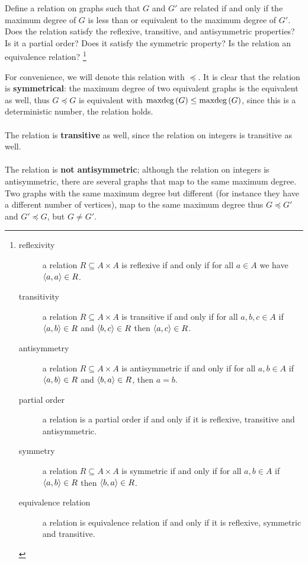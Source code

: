 \documentclass{article}
\begin{document}
\begin{exercise}
Define a relation on graphs such that $G$ and $G'$ are related if and only if the maximum degree of $G$ is less than or equivalent to the maximum degree of $G'$. Does the relation satisfy the reflexive, transitive, and antisymmetric properties? Is it a partial order? Does it satisfy the symmetric property? Is the relation an equivalence relation?
\footnote{\begin{description}
 \item[reflexivity] a relation $R\subseteq A\times A$ is reflexive if and only if for all $a\in A$ we have $\left\langle a,a \right\rangle\in R$.
 \item[transitivity] a relation $R\subseteq A\times A$ is transitive if and only if for all $a,b,c\in A$ if $\left\langle a,b \right\rangle\in R$ and $\left\langle b,c \right\rangle\in R$ then $\left\langle a,c \right\rangle\in R$.
 \item[antisymmetry] a relation $R\subseteq A\times A$ is antisymmetric if and only if for all $a,b\in A$ if $\left\langle a,b \right\rangle\in R$ and $\left\langle b,a \right\rangle\in R$, then $a=b$.
 \item[partial order] a relation is a partial order if and only if it is reflexive, transitive and antisymmetric.
 \item[symmetry] a relation $R\subseteq A\times A$ is symmetric if and only if for all $a,b\in A$ if $\left\langle a,b \right\rangle\in R$ then $\left\langle b,a \right\rangle\in R$.
 \item[equivalence relation] a relation is equivalence relation if and only if it is reflexive, symmetric and transitive.
\end{description}}
\begin{answer}
For convenience, we will denote this relation with $\preceq$. It is clear that the relation is \textbf{symmetrical}: the maximum degree of two equivalent graphs is the equivalent as well, thus $G\preceq G$ is equivalent with $\mbox{maxdeg}\left( G \right)\leq\mbox{maxdeg}\left( G \right)$, since this is a deterministic number, the relation holds.
\paragraph{}The relation is \textbf{transitive} as well, since the relation on integers is transitive as well.
\paragraph{}The relation is \textbf{not antisymmetric}; although the relation on integers is antisymmetric, there are several graphs that map to the same maximum degree. Two graphs with the same maximum degree but different (for instance they have a different number of vertices), map to the same maximum degree thus $G\preceq G'$ and $G'\preceq G$, but $G\neq G'$.

\end{answer}
\end{exercise}
\end{document}

